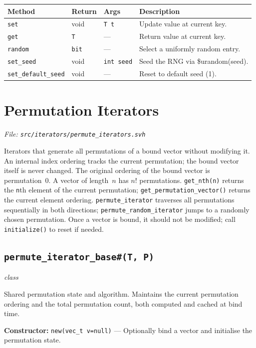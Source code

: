 \documentclass[11pt,letterpaper]{report}
\begin{document}
\begin{xltabular}{\linewidth}{>{\small}p{1.35in} >{\small}p{1.25in} >{\small}p{0.95in} >{\small}X}
\toprule
\textbf{Method} & \textbf{Return} & \textbf{Args} & \textbf{Description} \\
\midrule
\endhead
\bottomrule
\endfoot
\texttt{set} & void & \texttt{T t} & Update value at current key. \\
\texttt{get} & \texttt{T} & --- & Return value at current key. \\
\texttt{random} & \texttt{bit} & --- & Select a uniformly random entry. \\
\texttt{set\_seed} & void & \texttt{int seed} & Seed the RNG via \$urandom(seed). \\
\texttt{set\_default\_seed} & void & --- & Reset to default seed (1). \\
\end{xltabular}

\section{Permutation Iterators}
\noindent\small\textit{File: \texttt{src/iterators/permute\_iterators.svh}}\par

Iterators that generate all permutations of a bound vector without modifying it. An internal index ordering tracks the current permutation; the bound vector itself is never changed. The original ordering of the bound vector is permutation~0. A vector of length~$n$ has $n!$ permutations. \texttt{get\_nth(n)} returns the \texttt{n}th element of the current permutation; \texttt{get\_permutation\_vector()} returns the current element ordering. \texttt{permute\_iterator} traverses all permutations sequentially in both directions; \texttt{permute\_random\_iterator} jumps to a randomly chosen permutation. Once a vector is bound, it should not be modified; call \texttt{initialize()} to reset if needed.

\subsection*{\texttt{permute\_iterator\_base\#(T, P)}}
\noindent\small\textit{class}\par

Shared permutation state and algorithm. Maintains the current permutation ordering and the total permutation count, both computed and cached at bind time.

\noindent\textbf{Constructor:} \texttt{new(vec\_t v=null)} --- Optionally bind a vector and initialise the permutation state.
\end{document}
